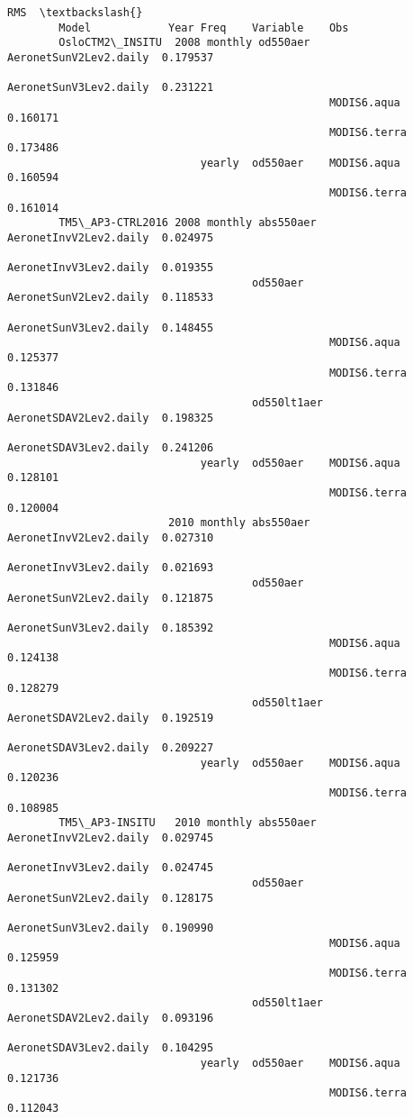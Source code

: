 \documentclass[11pt]{article}
\begin{document}
\begin{Verbatim}[commandchars=\\\{\}]
                                                                               RMS  \textbackslash{}
        Model            Year Freq    Variable    Obs                                
        OsloCTM2\_INSITU  2008 monthly od550aer    AeronetSunV2Lev2.daily  0.179537   
                                                  AeronetSunV3Lev2.daily  0.231221   
                                                  MODIS6.aqua             0.160171   
                                                  MODIS6.terra            0.173486   
                              yearly  od550aer    MODIS6.aqua             0.160594   
                                                  MODIS6.terra            0.161014   
        TM5\_AP3-CTRL2016 2008 monthly abs550aer   AeronetInvV2Lev2.daily  0.024975   
                                                  AeronetInvV3Lev2.daily  0.019355   
                                      od550aer    AeronetSunV2Lev2.daily  0.118533   
                                                  AeronetSunV3Lev2.daily  0.148455   
                                                  MODIS6.aqua             0.125377   
                                                  MODIS6.terra            0.131846   
                                      od550lt1aer AeronetSDAV2Lev2.daily  0.198325   
                                                  AeronetSDAV3Lev2.daily  0.241206   
                              yearly  od550aer    MODIS6.aqua             0.128101   
                                                  MODIS6.terra            0.120004   
                         2010 monthly abs550aer   AeronetInvV2Lev2.daily  0.027310   
                                                  AeronetInvV3Lev2.daily  0.021693   
                                      od550aer    AeronetSunV2Lev2.daily  0.121875   
                                                  AeronetSunV3Lev2.daily  0.185392   
                                                  MODIS6.aqua             0.124138   
                                                  MODIS6.terra            0.128279   
                                      od550lt1aer AeronetSDAV2Lev2.daily  0.192519   
                                                  AeronetSDAV3Lev2.daily  0.209227   
                              yearly  od550aer    MODIS6.aqua             0.120236   
                                                  MODIS6.terra            0.108985   
        TM5\_AP3-INSITU   2010 monthly abs550aer   AeronetInvV2Lev2.daily  0.029745   
                                                  AeronetInvV3Lev2.daily  0.024745   
                                      od550aer    AeronetSunV2Lev2.daily  0.128175   
                                                  AeronetSunV3Lev2.daily  0.190990   
                                                  MODIS6.aqua             0.125959   
                                                  MODIS6.terra            0.131302   
                                      od550lt1aer AeronetSDAV2Lev2.daily  0.093196   
                                                  AeronetSDAV3Lev2.daily  0.104295   
                              yearly  od550aer    MODIS6.aqua             0.121736   
                                                  MODIS6.terra            0.112043   
        

\end{Verbatim}
\end{document}
